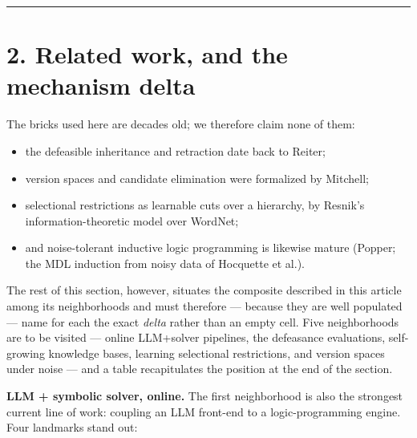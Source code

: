\documentclass[11pt]{article}
\begin{document}
\medskip\hrule\medskip

\section*{2. Related work, and the mechanism delta}

The bricks used here are decades old; we therefore claim none of them:

\begin{itemize}
\item the defeasible inheritance and retraction date back to Reiter;
\item version spaces and candidate elimination were formalized by Mitchell;
\item selectional restrictions as learnable cuts over a hierarchy, by Resnik's information-theoretic model over WordNet;
\item and noise-tolerant inductive logic programming is likewise mature (Popper; the MDL induction from noisy data of Hocquette et al.).
\end{itemize}

The rest of this section, however, situates the composite described in this article among its neighborhoods and must therefore — because they are well populated — name for each the exact \emph{delta} rather than an empty cell. Five neighborhoods are to be visited — online LLM+solver pipelines, the defeasance evaluations, self-growing knowledge bases, learning selectional restrictions, and version spaces under noise — and a table recapitulates the position at the end of the section.

\textbf{LLM + symbolic solver, online.} The first neighborhood is also the strongest current line of work: coupling an LLM front-end to a logic-programming engine. Four landmarks stand out:
\end{document}
